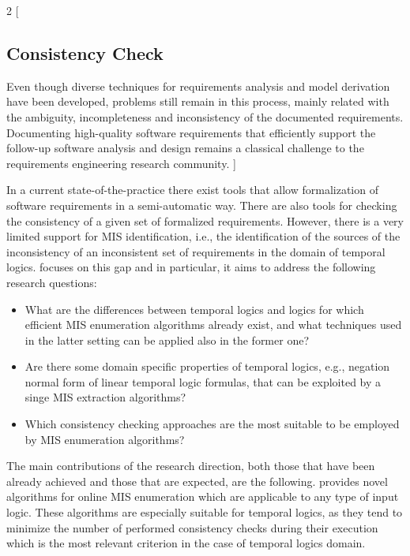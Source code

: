 \begin{minipage}{\linewidth}
	\begin{multicols*}{2}
		[
		\vspace{6 mm}
		\subsection{Consistency Check}
		Even though diverse techniques for requirements analysis and model derivation have been developed, problems still remain in this process, mainly related with the ambiguity, incompleteness and inconsistency of the documented requirements. Documenting high-quality software requirements \cite{Ieee1998} that efficiently support the follow-up software analysis and design remains a classical challenge to the requirements engineering research community. ]
		
		In a current state-of-the-practice there exist tools that allow formalization of software requirements in a semi-automatic way. There
		are also tools for checking the consistency of a given set of formalized requirements. However, there is a very limited support for
		\gls{MIS} identification, i.e., the identification of the sources of the inconsistency of an inconsistent set of requirements in the domain
		of temporal logics. \cite{Bendik:2017:CCR:3092703.3098239} focuses on this gap and in particular, it aims to address the following research questions:
		\begin{itemize}
			\item What are the differences between temporal logics and logics for which efficient \gls{MIS} enumeration algorithms already
			exist, and what techniques used in the latter setting can be
			applied also in the former one?
			\item Are there some domain specific properties of temporal
			logics, e.g., negation normal form of linear temporal logic formulas, that 	can be exploited by a singe \gls{MIS} extraction algorithms?
			\item Which consistency checking approaches are the most suitable to be employed by \gls{MIS} enumeration algorithms?
		\end{itemize}
		 
		The main contributions of the research direction, both those that
		have been already achieved and those that are expected, are the
		following. \cite{Bendik:2017:CCR:3092703.3098239} provides novel algorithms for online \gls{MIS} enumeration which are applicable to any type of input logic. These algorithms are especially suitable for temporal logics, as they tend to minimize the number of performed
		consistency checks during their execution which is the
		most relevant criterion in the case of temporal logics domain.
	\end{multicols*}
\end{minipage}

